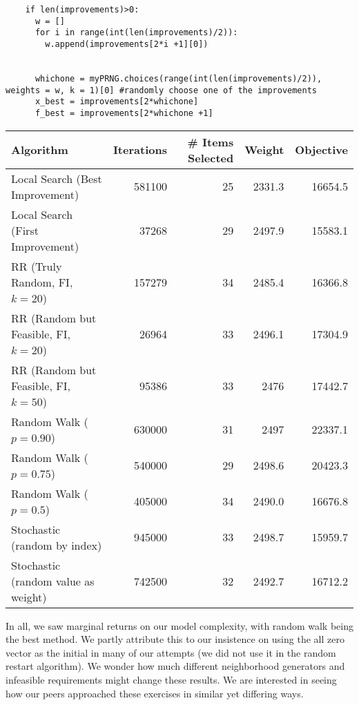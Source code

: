 \documentclass[11pt]{article}
\begin{document}
\begin{enumerate}
\begin{enumerate}
\begin{verbatim}
    if len(improvements)>0:
      w = []
      for i in range(int(len(improvements)/2)):
        w.append(improvements[2*i +1][0])


      whichone = myPRNG.choices(range(int(len(improvements)/2)), weights = w, k = 1)[0] #randomly choose one of the improvements
      x_best = improvements[2*whichone]
      f_best = improvements[2*whichone +1]
\end{verbatim}
\end{enumerate}
\begin{tabular}{lrrrr}
Algorithm&Iterations&\# Items Selected&Weight&Objective\\ \hline
Local Search (Best Improvement)&581100&25&2331.3&16654.5\\ 
Local Search (First Improvement)&37268&29&2497.9&15583.1\\
RR (Truly Random, FI, $k=20$) & 157279&34&2485.4&16366.8\\
RR (Random but Feasible, FI, $k = 20$)& 26964&33&2496.1&17304.9\\
RR (Random but Feasible, FI, $k = 50$)& 95386&33&2476&17442.7\\
Random Walk ($p = 0.90$) & 630000&31&2497&22337.1\\
Random Walk ($p = 0.75$) & 540000&29&2498.6&20423.3\\
Random Walk ($p = 0.5$) & 405000&34&2490.0&16676.8\\
Stochastic (random by index) &945000&33&2498.7&15959.7\\
Stochastic (random value as weight)&742500&32&2492.7&16712.2\\
\hline
\end{tabular}

\end{enumerate}
In all, we saw marginal returns on our model complexity, with random walk being the best method.  We partly attribute this to our insistence on using the all zero vector as the initial in many of our attempts (we did not use it in the random restart algorithm).  We wonder how much different neighborhood generators and infeasible requirements might change these results.  We are interested in seeing how our peers approached these exercises in similar yet differing ways.
\end{document}
